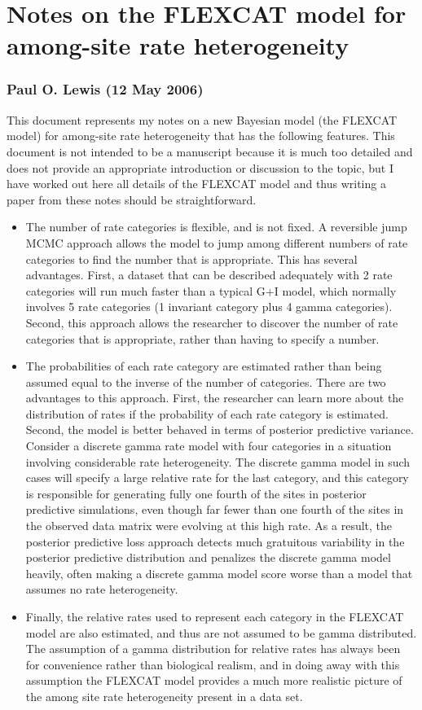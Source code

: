 \documentclass[12pt]{article}
\begin{document}
\section{Notes on the FLEXCAT model for among-site rate heterogeneity}
\subsubsection{Paul O. Lewis (12 May 2006)}

This document represents my notes on a new Bayesian model (the FLEXCAT model) for among-site rate heterogeneity that has the following features. This document is not intended to be a manuscript because it is much too detailed and does not provide an appropriate introduction or discussion to the topic, but I have worked out here all details of the FLEXCAT model and thus writing a paper from these notes should be straightforward.

\begin{itemize}
\item The number of rate categories is flexible, and is not fixed. A reversible jump MCMC approach allows the model to jump among different numbers of rate categories to find the number that is appropriate. This has several advantages. First, a dataset that can be described adequately with 2 rate categories will run much faster than a typical G+I model, which normally involves 5 rate categories (1 invariant category plus 4 gamma categories). Second, this approach allows the researcher to discover the number of rate categories that is appropriate, rather than having to specify a number.
\item The probabilities of each rate category are estimated rather than being assumed equal to the inverse of the number of categories. There are two advantages to this approach. First, the researcher can learn more about the distribution of rates if the probability of each rate category is estimated. Second, the model is better behaved in terms of posterior predictive variance. Consider a discrete gamma rate model with four categories in a situation involving considerable rate heterogeneity. The discrete gamma model in such cases will specify a large relative rate for the last category, and this category is responsible for generating fully one fourth of the sites in posterior predictive simulations, even though far fewer than one fourth of the sites in the observed data matrix were evolving at this high rate. As a result, the posterior predictive loss approach detects much gratuitous variability in the posterior predictive distribution and penalizes the discrete gamma model heavily, often making a discrete gamma model score worse than a model that assumes no rate heterogeneity.
\item Finally, the relative rates used to represent each category in the FLEXCAT model are also estimated, and thus are not assumed to be gamma distributed. The assumption of a gamma distribution for relative rates has always been for convenience rather than biological realism, and in doing away with this assumption the FLEXCAT model provides a much more realistic picture of the among site rate heterogeneity present in a data set.
\end{itemize}
\end{document}
